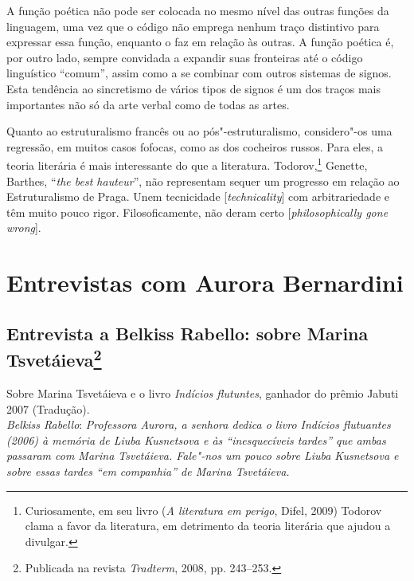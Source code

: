 {A função poética não pode ser colocada no mesmo nível das outras funções
da linguagem, uma vez que o código não emprega nenhum traço distintivo
para expressar essa função, enquanto o faz em relação às outras. A
função poética é, por outro lado, sempre convidada a expandir suas
fronteiras até o código linguístico ``comum'', assim como a se combinar
com outros sistemas de signos.
Esta tendência ao sincretismo de vários tipos de signos é um
dos traços mais importantes não só da arte verbal como de todas as artes.

Quanto ao estruturalismo francês ou ao pós"-estruturalismo, considero"-os
uma regressão, em muitos casos fofocas, como as dos cocheiros russos.
Para eles, a teoria literária é mais interessante do que a literatura.
Todorov,\footnote{Curiosamente, em seu livro (\emph{A literatura
em perigo}, Difel, 2009) Todorov clama a favor da literatura, em detrimento da
teoria literária que ajudou a divulgar.} Genette, Barthes, ``\emph{the best hauteur}'', não representam
sequer um progresso em relação ao Estruturalismo de Praga. Unem
tecnicidade [\emph{technicality}] com arbitrariedade e têm muito pouco
rigor. Filosoficamente, não deram certo [\emph{philosophically gone
wrong}].

\part{Entrevistas com Aurora Bernardini}

\chapter{Entrevista a Belkiss Rabello: sobre Marina Tsvetáieva\footnote{Publicada na revista
  \emph{Tradterm}, 2008, pp. 243--253.}}

Sobre Marina Tsvetáieva e o livro \emph{Indícios flutuntes}, ganhador do
prêmio Jabuti 2007 (Tradução). \\

\noindent
\emph{Belkiss Rabello}: \emph{Professora Aurora, a senhora dedica o
livro \emph{Indícios flutuantes} (2006) à memória de Liuba Kusnetsova e
às ``inesquecíveis tardes'' que ambas passaram com Marina Tsvetáieva.
Fale"-nos um pouco sobre Liuba Kusnetsova e sobre essas tardes ``em
companhia'' de Marina Tsvetáieva.}

}
